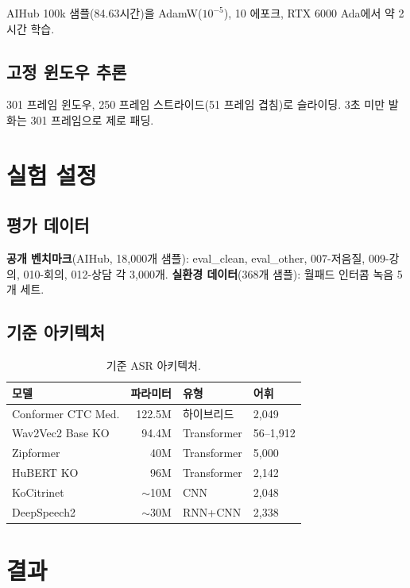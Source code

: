 \documentclass[a4paper,11pt,twocolumn]{article}
\begin{document}
AIHub 100k 샘플(84.63시간)을 AdamW($10^{-5}$), 10 에포크, RTX 6000 Ada에서 약 2시간 학습.

\subsection{고정 윈도우 추론}

301 프레임 윈도우, 250 프레임 스트라이드(51 프레임 겹침)로 슬라이딩. 3초 미만 발화는 301 프레임으로 제로 패딩.

\section{실험 설정}

\subsection{평가 데이터}

\textbf{공개 벤치마크}(AIHub, 18,000개 샘플): eval\_clean, eval\_other, 007-저음질, 009-강의, 010-회의, 012-상담 각 3,000개. \textbf{실환경 데이터}(368개 샘플): 월패드 인터콤 녹음 5개 세트.

\subsection{기준 아키텍처}

\begin{table}[t]
\centering
\caption{기준 ASR 아키텍처.}
\small
\begin{tabular}{@{}lrll@{}}
\toprule
모델 & 파라미터 & 유형 & 어휘 \\
\midrule
Conformer CTC Med. & 122.5M & 하이브리드 & 2,049 \\
Wav2Vec2 Base KO & 94.4M & Transformer & 56--1,912 \\
Zipformer & 40M & Transformer & 5,000 \\
HuBERT KO & 96M & Transformer & 2,142 \\
KoCitrinet & ${\sim}$10M & CNN & 2,048 \\
DeepSpeech2 & ${\sim}$30M & RNN+CNN & 2,338 \\
\bottomrule
\end{tabular}
\end{table}

\section{결과}
\end{document}
